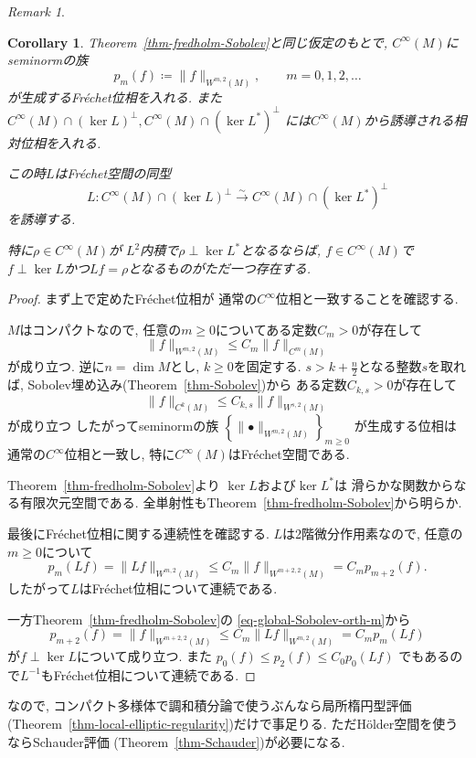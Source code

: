 \documentclass[dvipdfmx,a4paper,11pt]{article} %
\newtheorem{cor}[thm]{Corollary}
\theoremstyle{definition}
\theoremstyle{remark}
\newtheorem{rem}[thm]{Remark}
\numberwithin{equation}{section}
\begin{document}
\begin{rem}
\begin{cor}
\label{cor-fredholm-smooth}
Theorem~\ref{thm-fredholm-Sobolev}と同じ仮定のもとで,
$C^\infty(M)$にseminormの族
\[
p_m(f)
\coloneqq
\lVert f\rVert_{W^{m,2}(M)},
\qquad
m=0,1,2,\ldots
\]
が生成するFr\'echet位相を入れる.
また
\(
C^\infty(M)\cap(\ker L)^\perp,
C^\infty(M)\cap(\ker L^*)^\perp
\)
には$C^\infty(M)$から誘導される相対位相を入れる.

この時$L$はFr\'echet空間の同型
\[
L\colon
C^\infty(M)\cap(\ker L)^\perp
\overset{\sim}{\longrightarrow}
C^\infty(M)\cap(\ker L^*)^\perp
\]
を誘導する.

特に$\rho\in C^\infty(M)$が
$L^2$内積で$\rho\perp\ker L^*$となるならば,
$f\in C^\infty(M)$で
$f\perp\ker L$かつ$Lf=\rho$となるものがただ一つ存在する.
\end{cor}

\begin{proof}
まず上で定めたFr\'echet位相が
通常の$C^\infty$位相と一致することを確認する.

$M$はコンパクトなので,
任意の$m\geq0$についてある定数$C_m>0$が存在して
\[
\lVert f\rVert_{W^{m,2}(M)}
\leq
C_m\lVert f\rVert_{C^m(M)}
\]
が成り立つ.
逆に$n=\dim M$とし,
$k\geq0$を固定する.
$s>k+\frac{n}{2}$となる整数$s$を取れば,
Sobolev埋め込み(Theorem~\ref{thm-Sobolev})から
ある定数$C_{k,s}>0$が存在して
\[
\lVert f\rVert_{C^k(M)}
\leq
C_{k,s}\lVert f\rVert_{W^{s,2}(M)}
\]
が成り立つ
したがってseminormの族
\(
\left\{
\lVert\bullet\rVert_{W^{m,2}(M)}
\right\}_{m\geq0}
\)
が生成する位相は通常の$C^\infty$位相と一致し,
特に$C^\infty(M)$はFr\'echet空間である.

Theorem~\ref{thm-fredholm-Sobolev}より
$\ker L$および$\ker L^*$は
滑らかな関数からなる有限次元空間である.
全単射性もTheorem~\ref{thm-fredholm-Sobolev}から明らか. 

最後にFr\'echet位相に関する連続性を確認する.
$L$は2階微分作用素なので,
任意の$m\geq0$について
\[
p_m(Lf)
=
\lVert Lf\rVert_{W^{m,2}(M)}
\leq
C_m
\lVert f\rVert_{W^{m+2,2}(M)}
=
C_mp_{m+2}(f).
\]
したがって$L$はFr\'echet位相について連続である.

一方Theorem~\ref{thm-fredholm-Sobolev}の
\eqref{eq-global-Sobolev-orth-m}から
\[
p_{m+2}(f)
=
\lVert f\rVert_{W^{m+2,2}(M)}
\leq
C_m
\lVert Lf\rVert_{W^{m,2}(M)}
=
C_mp_m(Lf)
\]
が$f\perp\ker L$について成り立つ.
また
\(
p_0(f)\leq p_2(f)
\leq C_0p_0(Lf)
\)
でもあるので$L^{-1}$もFr\'echet位相について連続である.
\end{proof}



なので, コンパクト多様体で調和積分論で使うぶんなら局所楕円型評価(Theorem~\ref{thm-local-elliptic-regularity})だけで事足りる. ただH\"older空間を使うならSchauder評価 (Theorem~\ref{thm-Schauder})が必要になる. 
\end{rem}
\end{document}
